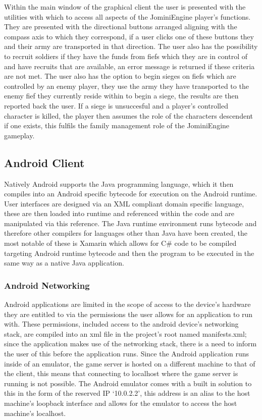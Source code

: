 \documentclass{article}
\begin{document}
Within the main window of the graphical client the user is presented with the utilities with which to access all aspects of the JominiEngine player's functions. They are presented with the directional buttons arranged aligning with the compass axis to which they correspond, if a user clicks one of these buttons they and their army are transported in that direction. The user also has the possibility to recruit soldiers if they have the funds from fiefs which they are in control of and have recruits that are available, an error message is returned if these criteria are not met. The user also has the option to begin sieges on fiefs which are controlled by an enemy player, they use the army they have transported to the enemy fief they currently reside within to begin a siege, the results are then reported back the user. If a siege is unsuccesful and a player's controlled character is killed, the player then assumes the role of the characters descendent if one exists, this fulfils the family management role of the JominiEngine gameplay.
\subsection{Android Client }

Natively Android supports the Java programming language, which it then compiles into an Android specific bytecode for execution on the Android runtime. User interfaces are designed via an XML compliant domain specific language, these are then loaded into runtime and referenced within the code and are manipulated via this reference. The Java runtime environment runs bytecode and therefore other compilers for languages other than Java have been created, the most notable of these is Xamarin which allows for C\# code to be compiled targeting Android runtime bytecode and then the program to be executed in the same way as a native Java application.

\subsubsection{Android Networking}

Android applications are limited in the scope of access to the device’s hardware they are entitled to via the permissions the user allows for an application to run with. These permissions, included access to the android device’s networking stack, are compiled into an xml file in the project’s root named manifests.xml; since the application makes use of the networking stack, there is a need to inform the user of this before the application runs. Since the Android application runs inside of an emulator, the game server is hosted on a different machine to that of the client, this means that connecting to localhost where the game server is running is not possible. The Android emulator comes with a built in solution to this in the form of the reserved IP ‘10.0.2.2’, this address is an alias to the host machine’s loopback interface and allows for the emulator to access the host machine’s localhost.
\end{document}
